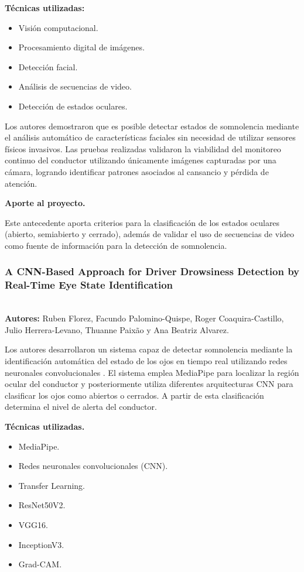 \documentclass[conference]{IEEEtran}
\begin{document}
\textbf{Técnicas utilizadas:}

\begin{itemize}
\item Visión computacional.
\item Procesamiento digital de imágenes.
\item Detección facial.
\item Análisis de secuencias de video.
\item Detección de estados oculares.
\end{itemize}

Los autores demostraron que es posible detectar estados de somnolencia mediante el análisis automático de características faciales sin necesidad de utilizar sensores físicos invasivos. Las pruebas realizadas validaron la viabilidad del monitoreo continuo del conductor utilizando únicamente imágenes capturadas por una cámara, logrando identificar patrones asociados al cansancio y pérdida de atención.

\textbf{Aporte al proyecto.}

Este antecedente aporta criterios para la clasificación de los estados oculares (abierto, semiabierto y cerrado), además de validar el uso de secuencias de video como fuente de información para la detección de somnolencia.\\

\subsubsection{\textbf{A CNN-Based Approach for Driver Drowsiness Detection by Real-Time Eye State Identification}} \mbox{}\\

\textbf{Autores:} Ruben Florez, Facundo Palomino-Quispe, Roger Coaquira-Castillo, Julio Herrera-Levano, Thuanne Paixão y Ana Beatriz Alvarez.

Los autores desarrollaron un sistema capaz de detectar somnolencia mediante la identificación automática del estado de los ojos en tiempo real utilizando redes neuronales convolucionales \parencite{florez2023cnn}.
El sistema emplea MediaPipe para localizar la región ocular del conductor y posteriormente utiliza diferentes arquitecturas CNN para clasificar los ojos como abiertos o cerrados. A partir de esta clasificación determina el nivel de alerta del conductor.

\textbf{Técnicas utilizadas.}

\begin{itemize}
\item MediaPipe.
\item Redes neuronales convolucionales (CNN).
\item Transfer Learning.
\item ResNet50V2.
\item VGG16.
\item InceptionV3.
\item Grad-CAM.
\end{itemize}
\end{document}
